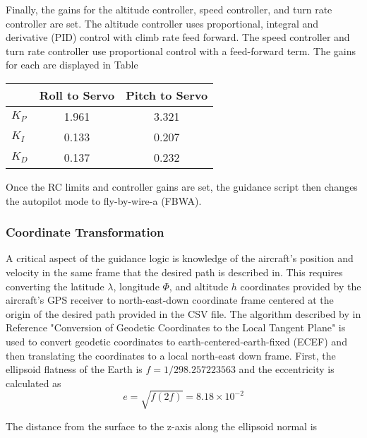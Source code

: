\documentclass{aiaa}
\begin{document}
Finally, the gains for the altitude controller, speed controller, and turn rate controller are set. The altitude controller uses proportional, integral and derivative (PID) control with climb rate feed forward. The speed controller and turn rate controller use proportional control with a feed-forward term. The gains for each are displayed in Table

\begin{center}
\begin{tabular}{ l| c | c }
	
      & Roll to Servo & Pitch to Servo \\
    \hline \hline
    $K_P$ & 1.961 & 3.321\\
    \hline
    
    $K_I$ & 0.133 & 0.207 \\
    \hline
    
    $K_D$ & 0.137 & 0.232 \\
    \hline


\end{tabular}
\end{center}

Once the RC limits and controller gains are set, the guidance script then changes the autopilot mode to fly-by-wire-a (FBWA).

\subsubsection{Coordinate Transformation}

A critical aspect of the guidance logic is knowledge of the aircraft's position and velocity in the same frame that the desired path is described in. This requires converting the latitude $\lambda$, longitude $\Phi$, and altitude $h$ coordinates provided by the aircraft's GPS receiver to north-east-down coordinate frame centered at the origin of the desired path provided in the CSV file. The algorithm described by in Reference "Conversion of Geodetic Coordinates to the Local Tangent Plane" is used to convert geodetic coordinates to earth-centered-earth-fixed (ECEF) and then translating the coordinates to a local north-east down frame. First, the ellipsoid flatness of the Earth is $f=1/298.257223563$ and the eccentricity is calculated as
\begin{equation}
e=\sqrt{f(2f)}=8.18\times10^{-2}
\end{equation}

The distance from the surface to the z-axis along the ellipsoid normal is
\end{document}
